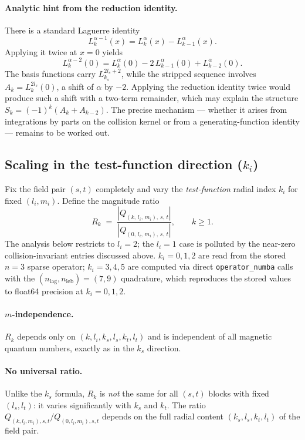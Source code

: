 \documentclass{article}
\begin{document}
\paragraph{Analytic hint from the reduction identity.}
There is a standard Laguerre identity
\[
  L_k^{\alpha-1}(x) = L_k^{\alpha}(x) - L_{k-1}^{\alpha}(x).
\]
Applying it twice at $x=0$ yields
\[
  L_k^{\alpha-2}(0) = L_k^{\alpha}(0) - 2\,L_{k-1}^{\alpha}(0) + L_{k-2}^{\alpha}(0).
\]
The basis functions carry $L_{k_s}^{2l_s+2}$, while the stripped sequence
involves $A_k = L_k^{2l_s}(0)$, a shift of $\alpha$ by $-2$.
Applying the reduction identity twice would produce such a shift with
a two-term remainder, which may explain the structure
$S_k = (-1)^k(A_k + A_{k-2})$.
The precise mechanism — whether it arises from integrations by parts on the
collision kernel or from a generating-function identity — remains to be worked out.

\subsection*{Scaling in the test-function direction ($k_i$)}

Fix the field pair $(s,t)$ completely and vary the \emph{test-function} radial
index $k_i$ for fixed $(l_i,m_i)$.
Define the magnitude ratio
\[
  R_k \;=\;
  \frac{|Q_{(k,\,l_i,\,m_i),\,s,\,t}|}{|Q_{(0,\,l_i,\,m_i),\,s,\,t}|},
  \qquad k \geq 1.
\]
The analysis below restricts to $l_i = 2$; the $l_i = 1$ case is polluted
by the near-zero collision-invariant entries discussed above.
$k_i = 0,1,2$ are read from the stored $n=3$ sparse operator;
$k_i = 3,4,5$ are computed via direct \texttt{operator\_numba} calls with
the $(n_\mathrm{lag},n_\mathrm{leb})=(7,9)$ quadrature, which reproduces
the stored values to float64 precision at $k_i=0,1,2$.

\paragraph{$m$-independence.}
$R_k$ depends only on $(k, l_i, k_s, l_s, k_t, l_t)$ and is independent of
all magnetic quantum numbers, exactly as in the $k_s$ direction.

\paragraph{No universal ratio.}
Unlike the $k_s$ formula, $R_k$ is \emph{not} the same for all $(s,t)$ blocks
with fixed $(l_s,l_t)$: it varies significantly with $k_s$ and $k_t$.
The ratio $Q_{(k,l_i,m_i),s,t}/Q_{(0,l_i,m_i),s,t}$ depends on the full
radial content $(k_s,l_s,k_t,l_t)$ of the field pair.
\end{document}
